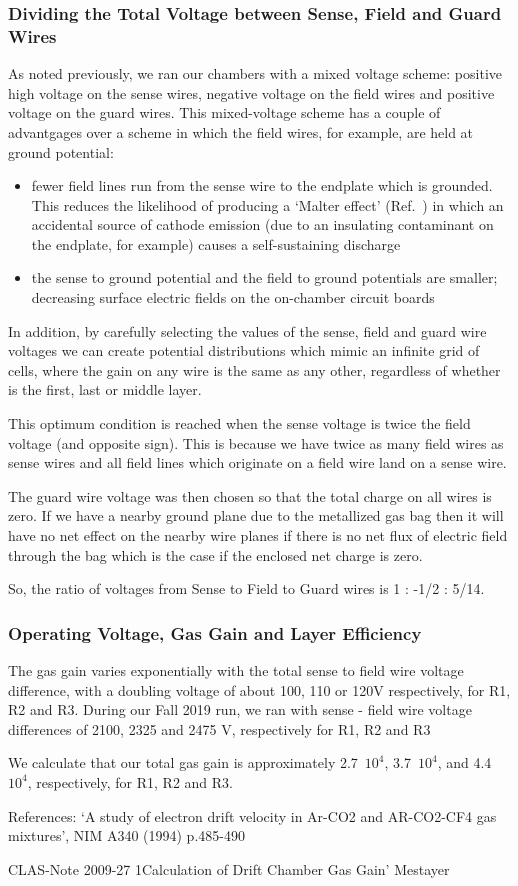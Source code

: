\subsubsection{Dividing the Total Voltage between Sense, Field and Guard Wires}
As noted previously, we ran our chambers with a mixed voltage scheme:
positive high voltage on the sense wires, negative voltage on the
field wires and positive voltage on the guard wires.
This mixed-voltage scheme has a couple of advantgages over a scheme in
which the field wires, for example, are held at ground potential:
\begin{itemize}
\item fewer field lines run from the sense wire to the endplate which
is grounded.  This reduces the likelihood of producing a `Malter effect'
(Ref.~\cite{Malter}) in which an accidental source of cathode emission
(due to an insulating contaminant on the endplate, for example) causes
a self-sustaining discharge
\item the sense to ground potential and the field to ground potentials 
are smaller; decreasing surface electric fields on the on-chamber
circuit boards
\end{itemize}

In addition, by carefully selecting the values of the sense, field and
guard wire voltages we can create potential distributions which mimic
an infinite grid of cells, where the gain on any wire is the same as
any other, regardless of whether is the first, last or middle layer.

This optimum condition is reached when the sense voltage is twice the
field voltage (and opposite sign).  This is because we have twice as many
field wires as sense wires and all field lines which originate on a
field wire land on a sense wire.  

The guard wire voltage was then chosen so that the total charge on all wires is zero.  
If we have a nearby ground plane due to the metallized gas bag then it will
have no net effect on the nearby wire planes if there is no net flux of
electric field through the bag which is the case if the enclosed net charge
is zero.

So, the ratio of voltages from Sense to Field to Guard wires is 1 : -1/2 : 5/14.

\subsubsection{Operating Voltage, Gas Gain and Layer Efficiency}
The gas gain varies exponentially with the total sense to field wire voltage
difference, with a doubling voltage of about 100, 110 or 120V respectively, for
R1, R2 and R3.  During our Fall 2019 run, we ran with sense - field wire voltage
differences of 2100, 2325 and 2475 V, respectively for R1, R2 and R3

We calculate that our total gas gain is approximately 2.7~$10^4$, 3.7~$10^4$, and 4.4~$10^4$,  
respectively, for R1, R2 and R3.


References: `A study of electron drift velocity in Ar-CO2 and AR-CO2-CF4 gas
mixtures', NIM A340 (1994) p.485-490

CLAS-Note 2009-27 1Calculation of Drift Chamber Gas Gain' Mestayer
